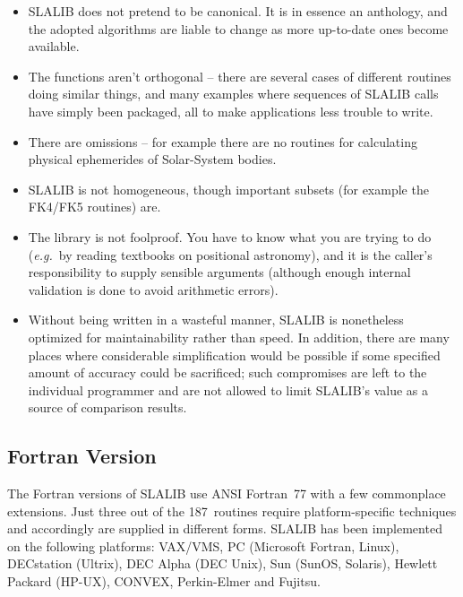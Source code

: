 \documentclass[11pt,twoside]{article}
\newcommand{\nroutines} {187}
\begin{document}
\begin{itemize}
\item SLALIB does not pretend to be canonical.  It is in essence
an anthology, and the adopted algorithms are liable
to change as more up-to-date ones become available.
\item The functions aren't orthogonal -- there are several
cases of different
routines doing similar things, and many examples where
sequences of SLALIB calls have simply been packaged, all to
make applications less trouble to write.
\item There are omissions -- for example there are no
routines for calculating physical ephemerides of
Solar-System bodies.
\item SLALIB is not homogeneous, though important subsets
(for example the FK4/FK5 routines) are.
\item The library is not foolproof.  You have to know what
you are trying to do ({\it e.g.}\ by reading textbooks on positional
astronomy), and it is the caller's responsibility to supply
sensible arguments (although enough internal validation is done to
avoid arithmetic errors).
\item Without being written in a wasteful
manner, SLALIB is nonetheless optimized for maintainability
rather than speed.  In addition, there are many places
where considerable simplification would be possible if some
specified amount of accuracy could be sacrificed;  such
compromises are left to the individual programmer and
are not allowed to limit SLALIB's value as a source
of comparison results.
\end{itemize}

\subsection{Fortran Version}
The Fortran versions of SLALIB use ANSI Fortran~77 with a few
commonplace extensions.  Just three out of the \nroutines\ routines require
platform-specific techniques and accordingly are supplied
in different forms.
SLALIB has been implemented on the following platforms:
VAX/VMS,
PC (Microsoft Fortran, Linux),
DECstation (Ultrix),
DEC Alpha (DEC Unix),
Sun (SunOS, Solaris),
Hewlett Packard (HP-UX),
CONVEX,
Perkin-Elmer and
Fujitsu.
\end{document}
